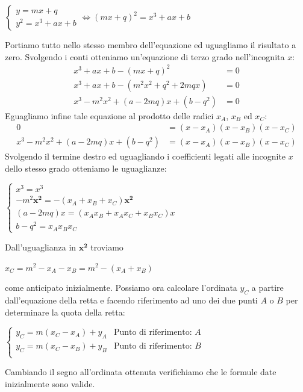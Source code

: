 \documentclass[a4paper,12pt]{tesiinfo}
\begin{document}
\begin{center}$
    \begin{cases}
        y = mx+q\\
        y^2 = x^3 + ax+b
    \end{cases}
     \iff (mx+q)^2 = x^3 + ax+b$
\end{center}
Portiamo tutto nello stesso membro dell'equazione ed uguagliamo il risultato a zero. Svolgendo i conti otteniamo un'equazione di terzo grado nell'incognita $x$:
\begin{align*}
 x^3 + ax+b - (mx+q)^2 &= 0\\
 x^3 + ax+b - (m^2x^2+q^2+2mqx) &= 0\\
 x^3 - m^2x^2 + (a-2mq)x+(b-q^2) &= 0
\end{align*}
Eguagliamo infine tale equazione al prodotto delle radici $x_A$, $x_B$ ed $x_C$:
\begin{align*}
 0 &= (x-x_A)(x-x_B)(x-x_C)\\
 x^3 - m^2x^2 + (a-2mq)x+(b-q^2) &= (x-x_A)(x-x_B)(x-x_C)
\end{align*}
Svolgendo il termine destro ed uguagliando i coefficienti legati alle incognite $x$ dello stesso grado otteniamo le uguaglianze:
\begin{center}
$\begin{cases}
 x^3 = x^3\\
 -m^2\mathbold{x^2} = -(x_A+x_B+x_C)\mathbold{x^2}\\
 (a-2mq)x = (x_Ax_B+x_Ax_C+x_Bx_C)x\\
 b-q^2 = x_Ax_Bx_C
\end{cases}$
\end{center}
Dall'uguaglianza in $\mathbold{x^2}$ troviamo 
\begin{center}
 $x_C = m^2 - x_A - x_B = m^2 - (x_A+x_B)$
\end{center}
come anticipato inizialmente. Possiamo ora calcolare l'ordinata $y_C$ a partire dall'equazione della retta e facendo riferimento ad uno dei due punti $A$ o $B$ per determinare la quota della retta:
\begin{center}$
 \begin{cases}
  y_C = m(x_C-x_A)+y_A & \text{Punto di riferimento: }A\\
  y_C = m(x_C-x_B)+y_B & \text{Punto di riferimento: }B\\
 \end{cases}$
\end{center}
Cambiando il segno all'ordinata ottenuta verifichiamo che le formule date inizialmente sono valide.
\end{document}
